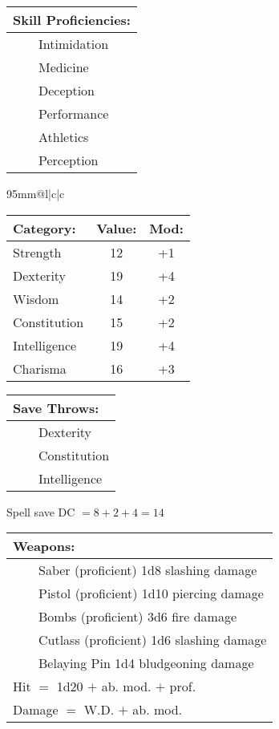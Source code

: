 \documentclass[11pt]{article}
\newcommand{\tabitem}{~~\llap{--}~~}
\begin{document}
\begin{multicols}{2}
\vspace{2mm}

\noindent \begin{tabularx}{95mm}{@{}l}
{\Large \textbf{Skill Proficiencies:}} \\
\hline
\tabitem Intimidation \\
\tabitem Medicine \\
\tabitem Deception \\
\tabitem Performance \\
\tabitem Athletics \\
\tabitem Perception
		\end{tabularx}

\vspace{4mm}

\noindent \begin{tabularx}{95mm}{@{}l|c|c}
 \\
\hline
		\end{tabularx}
\noindent \begin{tabular}{@{}l|c|c}
\textbf{Category:} 			& \textbf{Value:} 	& \textbf{Mod:} \\
\hline
Strength 					& 12	 				& +1		\\
Dexterity 					& 19	 				& +4		\\
Wisdom 						& 14					& +2		\\
Constitution 				& 15	 				& +2		\\
Intelligence 				& 19	 				& +4		\\
Charisma 					& 16	 				& +3
		\end{tabular}

\vspace{4mm}

\noindent \begin{tabularx}{95mm}{@{}l}
{\Large \textbf{Save Throws:}} \\
\hline
\tabitem Dexterity \\
\tabitem Constitution \\
\tabitem Intelligence \\
		\end{tabularx}
\noindent Spell save DC $= 8 + 2 + 4 = 14$

\vspace{4mm}

\noindent \begin{tabularx}{95mm}{@{}l}
{\Large \textbf{Weapons:}} \\
\hline
\tabitem Saber (proficient) 1d8 slashing damage \\
\tabitem Pistol (proficient) 1d10 piercing damage \\
\tabitem Bombs (proficient) 3d6 fire damage \\
\tabitem Cutlass (proficient) 1d6 slashing damage \\
\tabitem Belaying Pin 1d4 bludgeoning damage \\
Hit $=$ 1d20 $+$ ab. mod. $+$ prof. \\
Damage $=$ W.D. $+$ ab. mod.
		\end{tabularx}


\end{multicols}
\end{document}
